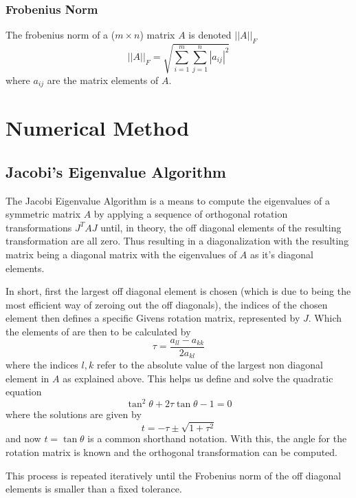 \documentclass[aip,nobalancelastpage,
twocolumn,
rsi,%
 amsmath,amssymb,
 reprint,%
]{revtex4}
\begin{document}
\subsubsection{Frobenius Norm}
The frobenius norm of a ($m\times n$) matrix $A$ is denoted $\left|\left|A\right|\right|_F$
\begin{equation}
\left|\left|A\right|\right|_F = \sqrt{\sum_{i=1}^m \sum_{j=1}^n \left|a_{ij}\right|^2}
\end{equation}
where $a_{ij}$ are the matrix elements of $A$.
\section{Numerical Method}
\subsection{Jacobi's Eigenvalue Algorithm}
The Jacobi Eigenvalue Algorithm is a means to compute the eigenvalues of a symmetric matrix $A$ by applying a sequence of orthogonal rotation transformations $J^TAJ$ until, in theory, the off diagonal elements of the resulting transformation are all zero. Thus resulting in a diagonalization with the resulting matrix being a diagonal matrix with the eigenvalues of $A$ as it's diagonal elements.\par
In short, first the largest off diagonal element is chosen (which is due to being the most efficient way of zeroing out the off diagonals), the indices of the chosen element then defines a specific Givens rotation matrix, represented by $J$.
Which the elements of are then to be calculated by 
\begin{equation}
\tau = \frac{a_{ll}-a_{kk}}{2a_{kl}}
\end{equation}
where the indices $l,k$ refer to the absolute value of the largest non diagonal element in $A$ as explained above. This helps us define and
solve the quadratic equation
\begin{equation}
\tan^2\theta +2\tau \tan\theta - 1 = 0
\end{equation}
where the solutions are given by 
\begin{equation}
t = -\tau \pm \sqrt{1+ \tau^2}
\end{equation}
and now $t=\tan\theta$ is a common shorthand notation. With this, the angle for the rotation matrix is known and the orthogonal transformation can be computed.\par
This process is repeated iteratively until the Frobenius norm of the off diagonal elements is smaller than a fixed tolerance.\par
\end{document}

